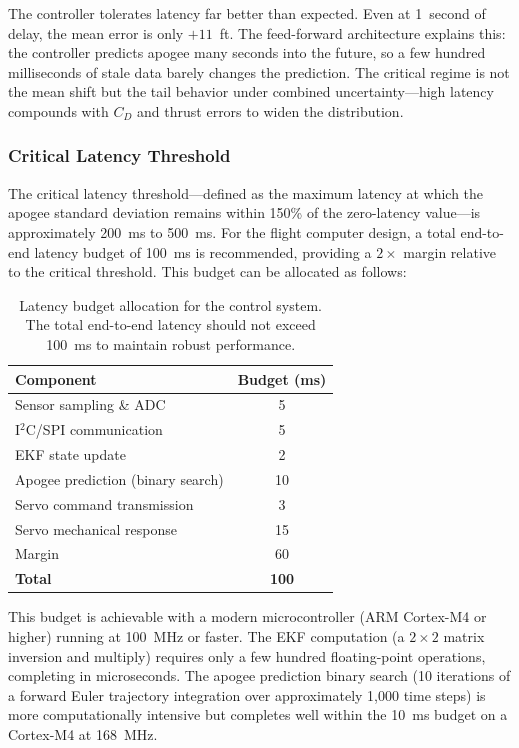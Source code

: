\documentclass[11pt,letterpaper]{article}
\newcommand{\Cd}{C_D}
\begin{document}
The controller tolerates latency far better than expected. Even at 1~second of delay, the mean error is only $+11$~ft. The feed-forward architecture explains this: the controller predicts apogee many seconds into the future, so a few hundred milliseconds of stale data barely changes the prediction. The critical regime is not the mean shift but the tail behavior under combined uncertainty---high latency compounds with $\Cd$ and thrust errors to widen the distribution.

\subsubsection{Critical Latency Threshold}

The critical latency threshold---defined as the maximum latency at which the apogee standard deviation remains within 150\% of the zero-latency value---is approximately \SI{200}{\milli\second} to \SI{500}{\milli\second}. For the flight computer design, a total end-to-end latency budget of \SI{100}{\milli\second} is recommended, providing a $2\times$ margin relative to the critical threshold. This budget can be allocated as follows:

\begin{table}[H]
    \centering
    \caption{Latency budget allocation for the control system. The total end-to-end latency should not exceed \SI{100}{\milli\second} to maintain robust performance.}
    \label{tab:latency_budget}
    \begin{tabular}{lc}
        \toprule
        \textbf{Component} & \textbf{Budget (ms)} \\
        \midrule
        Sensor sampling \& ADC & 5 \\
        I$^2$C/SPI communication & 5 \\
        EKF state update & 2 \\
        Apogee prediction (binary search) & 10 \\
        Servo command transmission & 3 \\
        Servo mechanical response & 15 \\
        Margin & 60 \\
        \midrule
        \textbf{Total} & \textbf{100} \\
        \bottomrule
    \end{tabular}
\end{table}

This budget is achievable with a modern microcontroller (ARM Cortex-M4 or higher) running at \SI{100}{\mega\hertz} or faster. The EKF computation (a $2\times 2$ matrix inversion and multiply) requires only a few hundred floating-point operations, completing in microseconds. The apogee prediction binary search (10 iterations of a forward Euler trajectory integration over approximately 1{,}000 time steps) is more computationally intensive but completes well within the \SI{10}{\milli\second} budget on a Cortex-M4 at \SI{168}{\mega\hertz}.
\end{document}

